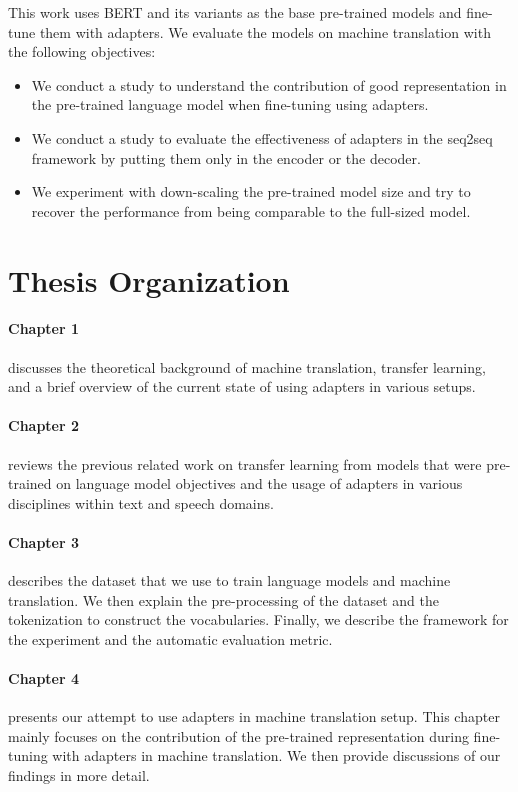This work uses BERT and its variants as the base pre-trained models and fine-tune them with adapters. We evaluate the models on machine translation with the following objectives:
\begin{itemize}
    \item We conduct a study to understand the contribution of good representation in the pre-trained language model when fine-tuning using adapters.
    \item We conduct a study to evaluate the effectiveness of adapters in the seq2seq framework by putting them only in the encoder or the decoder.
    \item We experiment with down-scaling the pre-trained model size and try to recover the performance from being comparable to the full-sized model.
\end{itemize}

\section*{Thesis Organization}

\paragraph{Chapter 1} discusses the theoretical background of machine translation, transfer learning, and a brief overview of the current state of using adapters in various setups.

\paragraph{Chapter 2} reviews the previous related work on transfer learning from models that were pre-trained on language model objectives and the usage of adapters in various disciplines within text and speech domains.

\paragraph{Chapter 3} describes the dataset that we use to train language models and machine translation. We then explain the pre-processing of the dataset and the tokenization to construct the vocabularies. Finally, we describe the framework for the experiment and the automatic evaluation metric.

\paragraph{Chapter 4} presents our attempt to use adapters in machine translation setup. This chapter mainly focuses on the contribution of the pre-trained representation during fine-tuning with adapters in machine translation. We then provide discussions of our findings in more detail.

